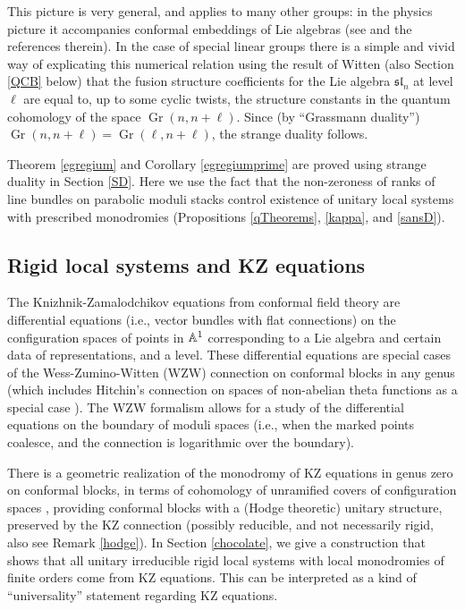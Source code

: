 \documentclass[11pt]{amsart}
\newcommand\Gr{\operatorname{Gr}}
\numberwithin{theorem}{subsection}
\begin{document}
{This picture is very general, and applies to many other groups: in the physics picture it accompanies conformal embeddings of Lie algebras (see  \cite{BJDG} and the references therein). In the case of special linear groups there is a simple and vivid way of explicating this numerical relation  using the result of  Witten \cite{Witten}  (also Section \ref{QCB} below) that  the fusion structure coefficients for the Lie algebra $\mathfrak{sl}_n$ at level $\ell$ are equal to, up to some cyclic twists, the  structure constants in the quantum cohomology of the space $\Gr(n,n+\ell)$. Since (by ``Grassmann duality'') $\Gr(n,n+\ell)=\Gr(\ell,n+\ell)$, the strange duality follows.

Theorem \ref{egregium} and Corollary \ref{egregiumprime} are proved using strange duality in Section \ref{SD}. Here we use the fact that the non-zeroness of ranks of line bundles on parabolic moduli stacks control existence of unitary local systems with prescribed monodromies (Propositions \ref{qTheorems}, \ref{kappa}, and \ref{sansD}).
 \subsection{Rigid local systems and KZ equations}
 The Knizhnik-Zamalodchikov equations from conformal field theory are  differential equations (i.e., vector bundles with flat connections)
 on the configuration spaces of points in $\Bbb{A}^1$ corresponding to a Lie algebra and certain data of representations, and a level.  These differential equations are special cases of the Wess-Zumino-Witten (WZW) connection on conformal blocks in any genus \cite{tuy} (which includes Hitchin's connection on spaces of non-abelian theta functions as a special case \cite{laszlo}). The WZW formalism allows for a study of the differential equations on the boundary of moduli spaces (i.e., when the marked points coalesce, and the connection is logarithmic over the boundary).

 There is a geometric realization \cite{Ram,BKZ,BM} of the monodromy of KZ equations in genus zero  on conformal blocks, in terms of cohomology of unramified covers of configuration spaces \cite{SV}, providing conformal blocks with a (Hodge theoretic) unitary structure, preserved by the KZ connection (possibly reducible, and not necessarily rigid, also see Remark \ref{hodge}). In Section \ref{chocolate}, we give  a construction that shows that all unitary irreducible rigid local systems with local monodromies  of finite orders come from KZ equations. This can be interpreted as a kind of ``universality'' statement regarding KZ equations.

}
\end{document}
